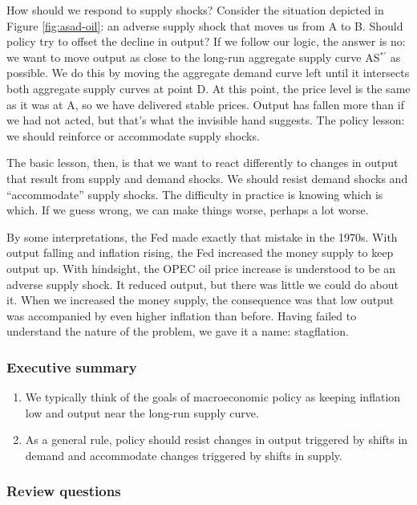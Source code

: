 \documentclass[letterpaper,12pt]{article}
\begin{document}
How should we respond to supply shocks?
Consider the situation depicted in Figure \ref{fig:asad-oil}:
an adverse supply shock that moves us from A to B.
Should policy try to offset the decline in output?
If we follow our logic, the answer is no:
we want to move output as close to the long-run aggregate supply
curve AS$^{*\prime}$ as possible.
We do this by moving the aggregate demand curve left until it intersects
both aggregate supply curves at point D.
At this point, the price level is the same as it was at A,
so we have delivered stable prices.
Output has fallen more than if we had not acted,
but that's what the invisible hand suggests.
The policy lesson:  we should reinforce or accommodate
supply shocks.

The basic lesson, then, is that we want to react differently to
changes in output that result from supply and demand shocks.
We should resist demand shocks and ``accommodate'' supply shocks.
The difficulty in practice is knowing which is which.
If we guess wrong, we can make things worse, perhaps a lot worse.

By some interpretations, the Fed made exactly that mistake in the 1970s.
With output falling and inflation rising, the Fed increased the money
supply to keep output up.
With hindsight, the OPEC oil price increase is understood to be an
adverse supply shock.
It reduced output, but there was little we could do about it.
When we increased the money supply, the consequence was that low
output was accompanied by even higher inflation than before.
Having failed to understand the nature of the problem,
we gave it a name:  stagflation.


\subsubsection*{Executive summary}

\begin{enumerate}
\item We typically think of the goals of macroeconomic
policy as keeping inflation low and output near the long-run
supply curve.

\item As a general rule, policy should resist changes in output
triggered by shifts in demand and accommodate
changes triggered by shifts in supply.
\end{enumerate}


\subsubsection*{Review questions}
\end{document}

